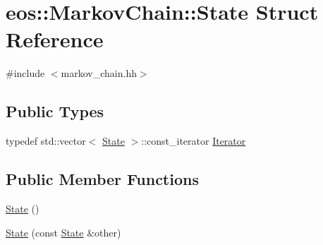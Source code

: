 \hypertarget{structeos_1_1MarkovChain_1_1State}{
\section{eos::MarkovChain::State Struct Reference}
\label{structeos_1_1MarkovChain_1_1State}
}


{\ttfamily \#include $<$markov\_\-chain.hh$>$}\subsection*{Public Types}
\begin{DoxyCompactItemize}
\item 
typedef std::vector$<$ \hyperlink{structeos_1_1MarkovChain_1_1State}{State} $>$::const\_\-iterator \hyperlink{structeos_1_1MarkovChain_1_1State_ad7590843e4feca7e696c53863e6e10c1}{Iterator}
\end{DoxyCompactItemize}
\subsection*{Public Member Functions}
\begin{DoxyCompactItemize}
\item 
\hyperlink{structeos_1_1MarkovChain_1_1State_a93beca0dcab0389f5b822394f341afc6}{State} ()
\item 
\hyperlink{structeos_1_1MarkovChain_1_1State_adaf4e7d6c9fc2b02f8adb1e924ceaf3e}{State} (const \hyperlink{structeos_1_1MarkovChain_1_1State}{State} \&other)
\end{DoxyCompactItemize}
